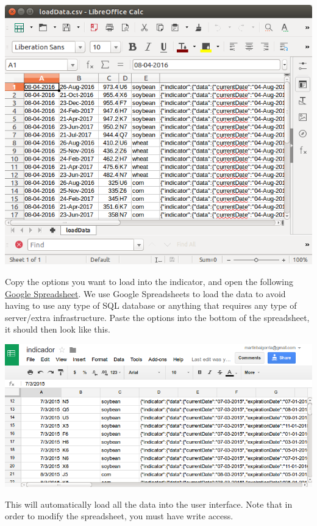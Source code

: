 \documentclass[10pt,a4paper]{book}
\begin{document}
\begin{center}
  \includegraphics[scale=0.40]{images/loadData}
\end{center}

Copy the options you want to load into the indicator, and open the following 
\href{https://docs.google.com/spreadsheets/d/18GAQ\_Rk8IFyiwPd2wjh\_4VAdpe0bmxBvUxWXxIIhoZ4/edit\#gid=0}{Google Spreadsheet}. We use Google Spreadsheets to load the data to avoid having to use any type of SQL database or anything that requires any type of server/extra infrastructure. Paste the options into the bottom of the spreadsheet, it should then look like this.

\begin{center}
  \includegraphics[scale=0.5]{images/spreadsheet}
\end{center}

This will automatically load all the data into the user interface. Note that in order to modify the spreadsheet, you must have write access.
\end{document}
